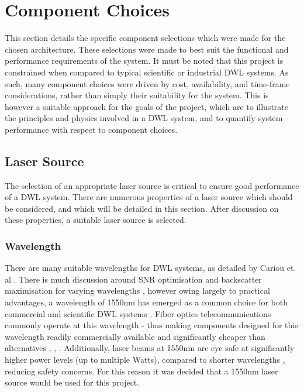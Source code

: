 \section{Component Choices}
\label{sec:design-ComponentChoices}
This section details the specific component selections which were made for the chosen architecture. These selections were made to best suit the functional and performance requirements of the system. It must be noted that this project is constrained when compared to typical scientific or industrial DWL systems. As such, many component choices were driven by cost, availability, and time-frame considerations, rather than simply their suitability for the system. This is however a suitable approach for the goals of the project, which are to illustrate the principles and physics involved in a DWL system, and to quantify system performance with respect to component choices. 
\subsection{Laser Source}
    The selection of an appropriate laser source is critical to ensure good performance of a DWL system. There are numerous properties of a laser source which should be considered, and which will be detailed in this section. After discussion on these properties, a suitable laser source is selected. 

    \subsubsection{Wavelength}
    There are many suitable wavelengths for DWL systems, as detailed by Cariou et. al \cite{cariou2006laser}. There is much discussion around SNR optimisation and backscatter maximisation for varying wavelengths \cite{bennett_doppler_2003}, however owing largely to practical advantages, a wavelength of 1550nm has emerged as a common choice for both commercial and scientific DWL systems \cite{abari_all-fiber_2014}. Fiber optics telecommunications  commonly operate at this wavelength - thus making components designed for this wavelength readily commercially available and significantly cheaper than alternatives \cite{cariou2006laser}, \cite{abdelazim_development_2015}, \cite{hill_remote_nodate}. Additionally, laser beams at 1550nm are eye-safe at significantly higher power levels (up to multiple Watts), compared to shorter wavelengths \cite{cariou2006laser}, reducing safety concerns. For this reason it was decided that a 1550nm laser source would be used for this project. 
    
